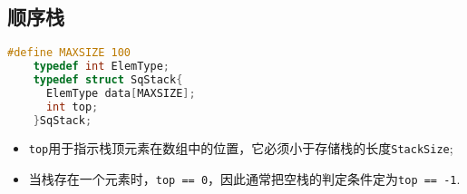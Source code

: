 \subsection{顺序栈}



%
%
\begin{frame}[fragile]\ft{\subsecname}
  \begin{lstlisting}[title=栈的结构定义,language=C]
    #define MAXSIZE 100
    typedef int ElemType;
    typedef struct SqStack{
      ElemType data[MAXSIZE];
      int top;
    }SqStack;
  \end{lstlisting}

  \begin{itemize}
  \item {\tt top}用于指示栈顶元素在数组中的位置，它必须小于存储栈的长度{\tt StackSize};
  \item 当栈存在一个元素时，{\tt top == 0}，因此通常把空栈的判定条件定为{\tt top == -1}.
  \end{itemize}
\end{frame}
%
%
\begin{frame}\ft{\subsecname}
  
\end{frame}
%
\begin{frame}\ft{\subsecname}
  
\end{frame}
%
\begin{frame}[fragile]\ft{\subsecname}
  
\end{frame}

